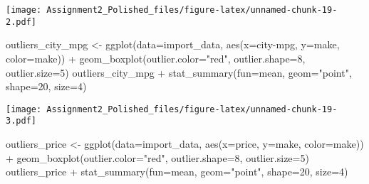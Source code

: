 \documentclass[
]{article}
\newenvironment{Shaded}{\begin{snugshade}}{\end{snugshade}}
\newcommand{\AttributeTok}[1]{\textcolor[rgb]{0.77,0.63,0.00}{#1}}
\newcommand{\DecValTok}[1]{\textcolor[rgb]{0.00,0.00,0.81}{#1}}
\newcommand{\FunctionTok}[1]{\textcolor[rgb]{0.00,0.00,0.00}{#1}}
\newcommand{\NormalTok}[1]{#1}
\newcommand{\OtherTok}[1]{\textcolor[rgb]{0.56,0.35,0.01}{#1}}
\newcommand{\SpecialCharTok}[1]{\textcolor[rgb]{0.00,0.00,0.00}{#1}}
\newcommand{\StringTok}[1]{\textcolor[rgb]{0.31,0.60,0.02}{#1}}
\begin{document}
\texttt{[image: Assignment2\_Polished\_files/figure-latex/unnamed-chunk-19-2.pdf]}

\begin{Shaded}
\begin{Highlighting}[]
\NormalTok{outliers\_city\_mpg }\OtherTok{\textless{}{-}} \FunctionTok{ggplot}\NormalTok{(}\AttributeTok{data=}\NormalTok{import\_data, }\FunctionTok{aes}\NormalTok{(}\AttributeTok{x=}\StringTok{\textasciigrave{}}\AttributeTok{city{-}mpg}\StringTok{\textasciigrave{}}\NormalTok{, }\AttributeTok{y=}\StringTok{\textasciigrave{}}\AttributeTok{make}\StringTok{\textasciigrave{}}\NormalTok{, }\AttributeTok{color=}\StringTok{\textasciigrave{}}\AttributeTok{make}\StringTok{\textasciigrave{}}\NormalTok{)) }\SpecialCharTok{+} \FunctionTok{geom\_boxplot}\NormalTok{(}\AttributeTok{outlier.color=}\StringTok{"red"}\NormalTok{, }\AttributeTok{outlier.shape=}\DecValTok{8}\NormalTok{, }\AttributeTok{outlier.size=}\DecValTok{5}\NormalTok{)}
\NormalTok{outliers\_city\_mpg }\SpecialCharTok{+} \FunctionTok{stat\_summary}\NormalTok{(}\AttributeTok{fun=}\NormalTok{mean, }\AttributeTok{geom=}\StringTok{"point"}\NormalTok{, }\AttributeTok{shape=}\DecValTok{20}\NormalTok{, }\AttributeTok{size=}\DecValTok{4}\NormalTok{)}
\end{Highlighting}
\end{Shaded}

\texttt{[image: Assignment2\_Polished\_files/figure-latex/unnamed-chunk-19-3.pdf]}

\begin{Shaded}
\begin{Highlighting}[]
\NormalTok{outliers\_price }\OtherTok{\textless{}{-}} \FunctionTok{ggplot}\NormalTok{(}\AttributeTok{data=}\NormalTok{import\_data, }\FunctionTok{aes}\NormalTok{(}\AttributeTok{x=}\StringTok{\textasciigrave{}}\AttributeTok{price}\StringTok{\textasciigrave{}}\NormalTok{, }\AttributeTok{y=}\StringTok{\textasciigrave{}}\AttributeTok{make}\StringTok{\textasciigrave{}}\NormalTok{, }\AttributeTok{color=}\StringTok{\textasciigrave{}}\AttributeTok{make}\StringTok{\textasciigrave{}}\NormalTok{)) }\SpecialCharTok{+} \FunctionTok{geom\_boxplot}\NormalTok{(}\AttributeTok{outlier.color=}\StringTok{"red"}\NormalTok{, }\AttributeTok{outlier.shape=}\DecValTok{8}\NormalTok{, }\AttributeTok{outlier.size=}\DecValTok{5}\NormalTok{)}
\NormalTok{outliers\_price }\SpecialCharTok{+} \FunctionTok{stat\_summary}\NormalTok{(}\AttributeTok{fun=}\NormalTok{mean, }\AttributeTok{geom=}\StringTok{"point"}\NormalTok{, }\AttributeTok{shape=}\DecValTok{20}\NormalTok{, }\AttributeTok{size=}\DecValTok{4}\NormalTok{)}
\end{Highlighting}
\end{Shaded}
\end{document}
